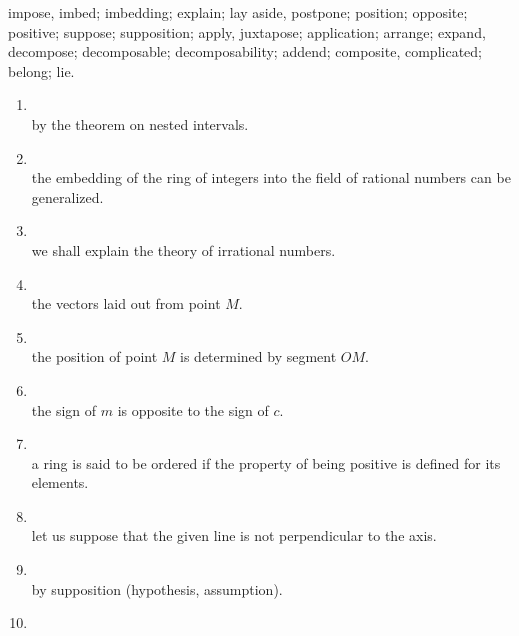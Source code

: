 \noindent{} impose, imbed;  imbedding;  explain;  lay aside, postpone;  position;  opposite;  positive;  suppose;  supposition;  apply, juxtapose;  application;  arrange;  expand, decompose;  decomposable;  decomposability;  addend;  composite, complicated;  belong;  lie.

\begin{enumerate}[label=\arabic*)]
\item {}\\
      by the theorem on nested intervals.
\item {}\\
      the embedding of the ring of integers into the field of rational numbers can be generalized.
\item {}\\
      we shall explain the theory of irrational numbers.
\item {}\\
      the vectors laid out from point $M$.
\item {}\\
      the position of point $M$ is determined by segment $OM$.
\item {}\\
      the sign of $m$ is opposite to the sign of $c$.
\item {}\\
      a ring is said to be ordered if the property of being positive is defined for its elements.
\item {}\\
      let us suppose that the given line is not perpendicular to the axis.
\item {}\\
      by supposition (hypothesis, assumption).
\item {}\\

\end{enumerate}
